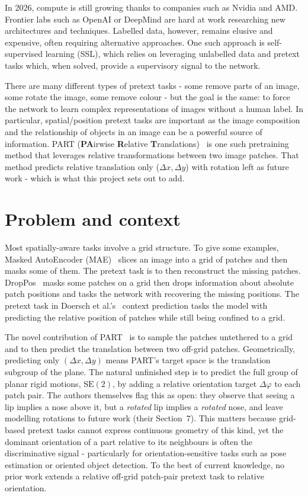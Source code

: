\documentclass[11pt,a4paper]{report}
\begin{document}
In 2026, compute is still growing thanks to companies such as Nvidia and AMD. Frontier labs such as OpenAI or DeepMind are hard at work researching new architectures and techniques. Labelled data, however, remains elusive and expensive, often requiring alternative approaches. One such approach is self-supervised learning (SSL), which relies on leveraging unlabelled data and pretext tasks which, when solved, provide a supervisory signal to the network.

There are many different types of pretext tasks - some remove parts of an image, some rotate the image, some remove colour - but the goal is the same: to force the network to learn complex representations of images without a human label. In particular, spatial/position pretext tasks are important as the image composition and the relationship of objects in an image can be a powerful source of information. PART (\textbf{PA}irwise \textbf{R}elative \textbf{T}ranslations)~\cite{part} is one such pretraining method that leverages relative transformations between two image patches. That method predicts relative translation only ($\Delta x,\Delta y$) with rotation left as future work - which is what this project sets out to add.

\section{Problem and context}
Most spatially-aware tasks involve a grid structure. To give some examples, Masked AutoEncoder (MAE)~\cite{mae} slices an image into a grid of patches and then masks some of them. The pretext task is to then reconstruct the missing patches. DropPos~\cite{droppos} masks some patches on a grid then drops information about absolute patch positions and tasks the network with recovering the missing positions. The pretext task in Doersch et al.'s~\cite{context2015} context prediction tasks the model with predicting the relative position of patches while still being confined to a grid.

The novel contribution of PART~\cite{part} is to sample the patches untethered to a grid and to then predict the translation between two off-grid patches. Geometrically, predicting only $(\Delta x, \Delta y)$ means PART's target space is the translation subgroup of the plane. The natural unfinished step is to predict the full group of planar rigid motions, $\mathrm{SE}(2)$, by adding a relative orientation target $\Delta\varphi$ to each patch pair. The authors themselves flag this as open: they observe that seeing a lip implies a nose above it, but a \emph{rotated} lip implies a \emph{rotated} nose, and leave modelling rotations to future work (their Section~7). This matters because grid-based pretext tasks cannot express continuous geometry of this kind, yet the dominant orientation of a part relative to its neighbours is often the discriminative signal - particularly for orientation-sensitive tasks such as pose estimation or oriented object detection. To the best of current knowledge, no prior work extends a relative off-grid patch-pair pretext task to relative orientation.
\end{document}
